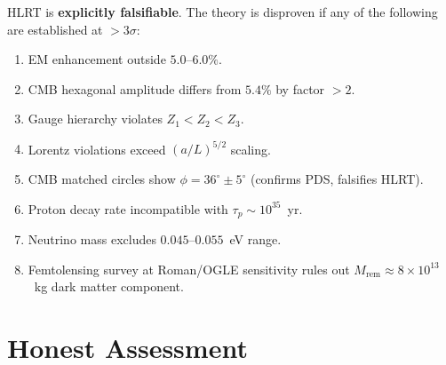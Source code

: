 \documentclass[11pt,letterpaper]{article}
\begin{document}
HLRT is \textbf{explicitly falsifiable}.  The theory is disproven if any
of the following are established at $>3\sigma$:

\begin{enumerate}[label=\textbf{F\arabic*.},nosep]
  \item EM enhancement outside $5.0$--$6.0\%$.
  \item CMB hexagonal amplitude differs from $5.4\%$ by factor $>2$.
  \item Gauge hierarchy violates $Z_1 < Z_2 < Z_3$.
  \item Lorentz violations exceed $(a/L)^{5/2}$ scaling.
  \item CMB matched circles show $\phi=36^\circ\pm5^\circ$
        (confirms PDS, falsifies HLRT).
  \item Proton decay rate incompatible with $\tau_p\sim10^{35}$~yr.
  \item Neutrino mass excludes $0.045$--$0.055$~eV range.
  \item Femtolensing survey at Roman/OGLE sensitivity rules out
        $M_\mathrm{rem}\approx8\times10^{13}$~kg dark matter component.
\end{enumerate}

\section{Honest Assessment}
\end{document}
